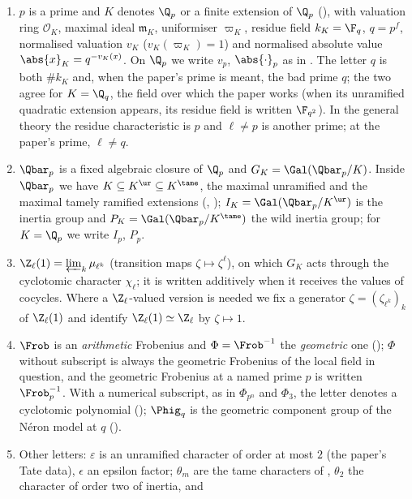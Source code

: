 \begin{convention}\label{conv:local:conventions}
\begin{enumerate}[label=(\alph*)]
\item $p$ is a prime and $K$ denotes $\Q_p$ or a finite extension of $\Q_p$ (), with valuation ring $\mathcal O_K$, maximal
ideal $\mathfrak m_K$, uniformiser $\varpi_K$, residue field $k_K=\F_q$, $q=p^{f}$, normalised valuation $v_K$ ($v_K(\varpi_K)=1$) and normalised
absolute value $\abs{x}_K=q^{-v_K(x)}$. On $\Q_p$ we write $v_p$, $\abs{\cdot}_p$ as in . The letter $q$ is both $\#k_K$ and,
when the paper's prime is meant, the bad prime $q$; the two agree for $K=\Q_q$, the field over which the paper works (when its unramified
quadratic extension appears, its residue field is written $\F_{q^2}$). In the general theory
the residue characteristic is $p$ and $\ell\ne p$ is another prime; at the paper's prime, $\ell\ne q$.
\item $\Qbar_p$ is a fixed algebraic closure of $\Q_p$ and $G_K=\Gal(\Qbar_p/K)$. Inside $\Qbar_p$ we have $K\subseteq K^{\ur}\subseteq K^{\tame}$,
the maximal unramified and the maximal tamely ramified extensions (, );
$I_K=\Gal(\Qbar_p/K^{\ur})$ is the inertia group and $P_K=\Gal(\Qbar_p/K^{\tame})$ the wild inertia group; for $K=\Q_p$ we write $I_p$, $P_p$.
\item $\Z_\ell(1)=\varprojlim_k\mu_{\ell^k}$ (transition maps $\zeta\mapsto\zeta^\ell$), on which $G_K$ acts through the cyclotomic character
$\chi_\ell$; it is written additively when it receives the values of cocycles. Where a $\Z_\ell$-valued version is needed we fix a
generator $\zeta=(\zeta_{\ell^k})_k$ of $\Z_\ell(1)$ and identify $\Z_\ell(1)\simeq\Z_\ell$ by $\zeta\mapsto1$.
\item $\Frob$ is an \emph{arithmetic} Frobenius and $\Phi=\Frob^{-1}$ the \emph{geometric} one (); $\Phi$ without subscript
is always the geometric Frobenius of the local field in question, and the geometric Frobenius at a named prime $p$ is written $\Frob_p^{-1}$. With a
numerical subscript, as in $\Phi_{p^n}$ and $\Phi_3$, the letter denotes a cyclotomic polynomial (); $\Phig_q$ is the geometric component
group of the N\'eron model at $q$ ().
\item Other letters: $\varepsilon$ is an unramified character of order at most $2$ (the paper's Tate data), $\epsilon$ an
epsilon factor; $\theta_m$ are the tame characters of , $\theta_2$ the character of order two of inertia, and

\end{enumerate}
\end{convention}
